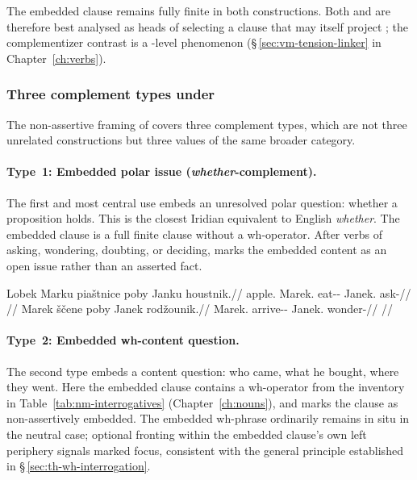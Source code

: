 \begin{center}
\end{center}

The embedded clause remains fully finite in both constructions. Both 
and  are therefore best analysed as heads of  selecting a clause
that may itself project ; the complementizer contrast is a
-level phenomenon (§\,\ref{sec:vm-tension-linker} in
Chapter~\ref{ch:verbs}).

\subsubsection{Three complement types under }

The non-assertive framing of  covers three complement types, which
are not three unrelated constructions but three values of the same broader
category.

\paragraph{Type~1: Embedded polar issue (\textit{whether}-complement).}
The first and most central use embeds an unresolved polar question: whether a
proposition holds. This is the closest Iridian equivalent to English
\textit{whether}. The embedded clause is a full finite clause without a
wh-operator. After verbs of asking, wondering, doubting, or deciding,
 marks the embedded content as an open issue rather than an
asserted fact.

\pex
\a
\begingl
\gla Lobek Marku piaštnice poby Janku houstnik.//
\glb apple.\Dir{} Marek.\Trs{} eat-\Pf{}-\Lnk{} \Compl{} Janek.\Trs{} ask-\Pf{}//
\glft {}//
\endgl
\a
\begingl
\gla Marek ščene poby Janek rodžounik.//
\glb Marek.\Dir{} arrive-\Pf{}-\Lnk{} \Compl{} Janek.\Dir{} wonder-\Cont{}//
\glft {}//
\endgl
\xe

\paragraph{Type~2: Embedded wh-content question.}
The second type embeds a content question: who came, what he bought, where
they went. Here the embedded clause contains a wh-operator from the inventory
in Table~\ref{tab:nm-interrogatives} (Chapter~\ref{ch:nouns}), and 
marks the clause as non-assertively embedded. The embedded wh-phrase
ordinarily remains in situ in the neutral case; optional fronting within the
embedded clause's own left periphery signals marked focus, consistent with the
general principle established in §\,\ref{sec:th-wh-interrogation}.

